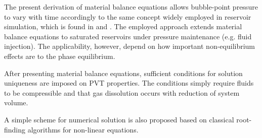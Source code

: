 \documentclass[authoryear,preprint,review,12pt]{elsarticle}
\begin{document}

The present derivation of material balance equations allows bubble-point pressure to vary with time accordingly to the same concept widely employed in reservoir simulation, which is found in \cite{aziz1979petroleum} and \cite{ertekin2001basic}. The employed approach extends material balance equations to saturated reservoirs under pressure maintenance (e.g. fluid injection). The applicability, however, depend on how important non-equilibrium effects are to the phase equilibrium.


After presenting material balance equations, sufficient conditions for solution uniqueness are imposed on PVT properties. The conditions simply require fluids to be compressible and that gas dissolution occurs with reduction of system volume.

A simple scheme for numerical solution is also proposed based on classical root-finding algorithms for non-linear equations.
\end{document}
